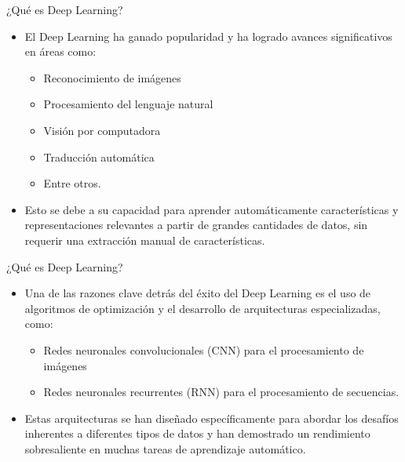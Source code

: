 \documentclass[11pt,aspectratio=169]{beamer}
\begin{document}
\begin{frame}{¿Qué es Deep Learning?}
	\begin{itemize}
		\item El Deep Learning ha ganado popularidad y ha logrado avances significativos en áreas como: \pause
			\begin{itemize}
				\item Reconocimiento de imágenes\pause
				\item Procesamiento del lenguaje natural\pause
				\item Visión por computadora\pause
				\item Traducción automática\pause
				\item Entre otros. \pause
			\end{itemize} 
			
		\item Esto se debe a su capacidad para aprender automáticamente características y representaciones relevantes a partir de grandes 
			cantidades de datos, sin requerir una extracción manual de características.
	\end{itemize}
\end{frame}

\begin{frame}{¿Qué es Deep Learning?}
	\begin{itemize}
		\item Una de las razones clave detrás del éxito del Deep Learning es el uso de algoritmos de optimización y el desarrollo de 
			arquitecturas especializadas, como:\pause
			\begin{itemize}
				\item Redes neuronales convolucionales (CNN) para el procesamiento de imágenes \pause
				\item Redes neuronales recurrentes (RNN) para el procesamiento de secuencias.\pause 
			\end{itemize} 
		\item Estas arquitecturas se han diseñado específicamente para abordar los desafíos inherentes a diferentes tipos de datos 
			y han demostrado un rendimiento sobresaliente en muchas tareas de aprendizaje automático.
	\end{itemize}
\end{frame}
\end{document}
